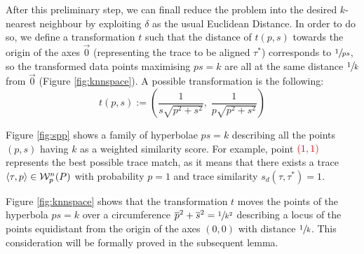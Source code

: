 After this preliminary step, we can finall reduce the problem into the desired $k$-nearest neighbour by exploiting $\delta$ as the usual Euclidean Distance. In order to do so, we define a transformation $t$ such that the distance of $t(p,s)$ towards  the origin of the axes $\vec{0}$ (representing the trace to be aligned $\tau^*$) corresponds to $\sfrac{1}{ps}$, so the transformed data points maximising $ps=k$ are all at the same distance $\sfrac{1}{k}$ from $\vec{0}$ (Figure \ref{fig:knnspace}). A possible transformation is the following:
\[t(p,s):=\left(\frac{1}{s\sqrt{p^2+s^2}},\; \frac{1}{p\sqrt{p^2+s^2}}\right)\]

\begin{example}
Figure \ref{fig:spp} shows a family of hyperbolae $ps=k$ describing all the points $(p,s)$ having $k$ as a weighted similarity score. For example,  point $\color{red}(1,1)$ represents the best possible trace match, as it means that there exists a trace $\braket{\tau,p}\in\mathcal{W}_p^n(P)$ with probability $p=1$ and trace similarity $s_d(\tau,\tau^*)=1$.

Figure \ref{fig:knnspace} shows that the transformation $t$ moves the points of the hyperbola $ps=k$ over a circumference $\overline{p}^2+\overline{s}^2=\sfrac{1}{k^2}$ describing a locus of the points equidistant from the origin of the axes $(0,0)$ with distance $\sfrac{1}{k}$. %
This consideration will be formally proved in the subsequent lemma.
\end{example}

